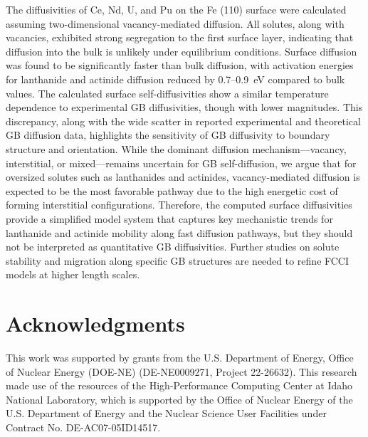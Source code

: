 \documentclass[preprint,12pt]{elsarticle}
\begin{document}
The diffusivities of Ce, Nd, U, and Pu on the Fe (110) surface were calculated assuming two-dimensional vacancy-mediated diffusion. All solutes, along with vacancies, exhibited strong segregation to the first surface layer, indicating that diffusion into the bulk is unlikely under equilibrium conditions. 
Surface diffusion was found to be significantly faster than bulk diffusion, with activation energies for lanthanide and actinide diffusion reduced by 0.7–0.9~eV compared to bulk values. The calculated surface self-diffusivities show a similar temperature dependence to experimental GB diffusivities, though with lower magnitudes. This discrepancy, along with the wide scatter in reported experimental and theoretical GB diffusion data, highlights the sensitivity of GB diffusivity to boundary structure and orientation. 
While the dominant diffusion mechanism—vacancy, interstitial, or mixed—remains uncertain for GB self-diffusion, we argue that for oversized solutes such as lanthanides and actinides, vacancy-mediated diffusion is expected to be the most favorable pathway due to the high energetic cost of forming interstitial configurations. 
Therefore, the computed surface diffusivities provide a simplified model system that captures key mechanistic trends for lanthanide and actinide mobility along fast diffusion pathways, but they should not be interpreted as quantitative GB diffusivities. Further studies on solute stability and migration along specific GB structures are needed to refine FCCI models at higher length scales.

\section{Acknowledgments}

This work was supported by grants from the U.S. Department of Energy, Office of Nuclear Energy (DOE-NE) (DE-NE0009271, Project 22-26632). This research made use of the resources of the High-Performance Computing Center at Idaho National Laboratory, which is supported by the Office of Nuclear Energy of the U.S. Department of Energy and the Nuclear Science User Facilities under Contract No. DE-AC07-05ID14517.



\FloatBarrier
 

\end{document}

